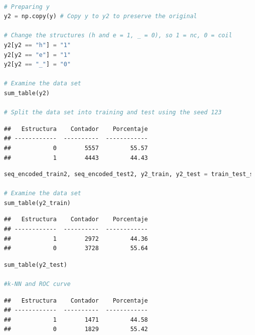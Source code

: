 \documentclass[
]{article}
\begin{document}
\begin{lstlisting}[language=Python]

# Preparing y
y2 = np.copy(y) # Copy y to y2 to preserve the original

# Change the structures (h and e = 1, _ = 0), so 1 = nc, 0 = coil
y2[y2 == "h"] = "1"
y2[y2 == "e"] = "1"
y2[y2 == "_"] = "0"

# Examine the data set
sum_table(y2)

# Split the data set into training and test using the seed 123
\end{lstlisting}

\begin{lstlisting}
##   Estructura    Contador    Porcentaje
## ------------  ----------  ------------
##            0        5557         55.57
##            1        4443         44.43
\end{lstlisting}

\begin{lstlisting}[language=Python]
seq_encoded_train2, seq_encoded_test2, y2_train, y2_test = train_test_split(seq_encoded, y2 ,test_size=0.33,  random_state=123)

# Examine the data set
sum_table(y2_train)
\end{lstlisting}

\begin{lstlisting}
##   Estructura    Contador    Porcentaje
## ------------  ----------  ------------
##            1        2972         44.36
##            0        3728         55.64
\end{lstlisting}

\begin{lstlisting}[language=Python]
sum_table(y2_test)

#k-NN and ROC curve
\end{lstlisting}

\begin{lstlisting}
##   Estructura    Contador    Porcentaje
## ------------  ----------  ------------
##            1        1471         44.58
##            0        1829         55.42
\end{lstlisting}
\end{document}
